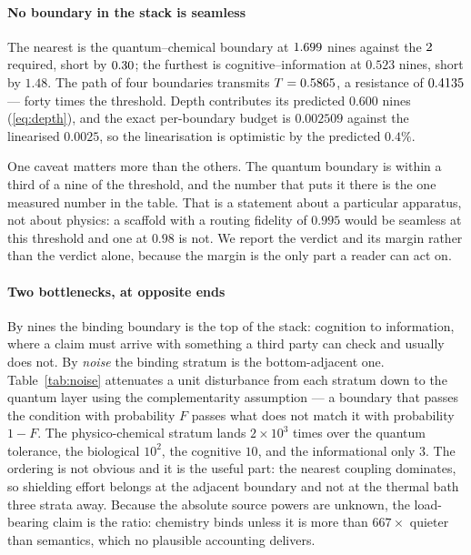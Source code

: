 \documentclass[conference]{IEEEtran}
\theoremstyle{definition}
\begin{document}
\paragraph{No boundary in the stack is seamless} The nearest is the
quantum--chemical boundary at $1.699$ nines against the
$2$ required, short by $0.30$; the furthest is
cognitive--information at $0.523$ nines, short by $1.48$. The path of four
boundaries transmits $T=0.5865$, a resistance of $0.4135$ --- forty times the
threshold. Depth contributes its predicted $0.600$ nines
(\eqref{eq:depth}), and the exact per-boundary budget is $0.002509$ against the
linearised $0.0025$, so the linearisation is optimistic by the predicted $0.4\%$.

One caveat matters more than the others. The quantum boundary is within a third of
a nine of the threshold, and the number that puts it there is the one measured
number in the table. That is a statement about a particular apparatus, not about
physics: a scaffold with a routing fidelity of $0.995$ would be seamless at this
threshold and one at $0.98$ is not. We report the verdict and its margin rather
than the verdict alone, because the margin is the only part a reader can act on.

\paragraph{Two bottlenecks, at opposite ends} By nines the binding boundary is
the top of the stack: cognition to information, where a claim must arrive with
something a third party can check and usually does not. By \emph{noise} the
binding stratum is the bottom-adjacent one. Table~\ref{tab:noise} attenuates a
unit disturbance from each stratum down to the quantum layer using the
complementarity assumption --- a boundary that passes the condition with
probability $F$ passes what does not match it with probability $1-F$. The
physico-chemical stratum lands $2\times10^{3}$ times over the quantum tolerance,
the biological $10^{2}$, the cognitive $10$, and the informational only $3$. The
ordering is not obvious and it is the useful part: the nearest coupling dominates,
so shielding effort belongs at the adjacent boundary and not at the thermal bath
three strata away. Because the absolute source powers are unknown, the
load-bearing claim is the ratio: chemistry binds unless it is more than
$667\times$ quieter than semantics, which no plausible accounting delivers.

\begin{table}[t]
\centering
\caption{Noise reaching the quantum stratum from each coarser stratum, at unit
source power, against the phase tolerance $F_{\text{phase}}=\phaseFid$.
``Over budget'' is the factor by which the source alone exceeds tolerance. The
model assumes pass and stop bands are exact complements; see
Section~\ref{sec:threats}.}
\label{tab:noise}
\footnotesize

\end{table}
\end{document}
